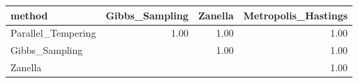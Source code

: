 \begin{table}[ht]
\centering
\begin{tabular}{lrrr}
  \hline
method & Gibbs\_Sampling & Zanella & Metropolis\_Hastings \\ 
  \hline
Parallel\_Tempering & 1.00 & 1.00 & 1.00 \\ 
  Gibbs\_Sampling &  & 1.00 & 1.00 \\ 
  Zanella &  &  & 1.00 \\ 
   \hline
\end{tabular}
\end{table}
